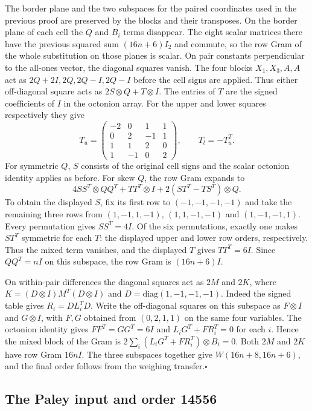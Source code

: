 \documentclass[10pt]{article}
\begin{document}
The border plane and the two subspaces for the paired coordinates used in the previous proof are preserved by the blocks and their transposes. On the border plane of each cell the $Q$ and $B_i$ terms disappear. The eight scalar matrices there have the previous squared sum $(16n+6)I_2$ and commute, so the row Gram of the whole substitution on those planes is scalar.
On pair constants perpendicular to the all-ones vector, the diagonal squares vanish. The four blocks $X_1,X_3,A,A$ act as $2Q+2I,2Q,2Q-I,2Q-I$ before the cell signs are applied. Thus either off-diagonal square acts as $2S\otimes Q+T\otimes I$. The entries of $T$ are the signed coefficients of $I$ in the octonion array. For the upper and lower squares respectively they give
\[
 T_u=\begin{pmatrix}-2&0&1&1\\0&2&-1&1\\1&1&2&0\\1&-1&0&2\end{pmatrix},\qquad
 T_l=-T_u^T .
\]
For symmetric $Q$, $S$ consists of the original cell signs and the scalar octonion identity applies as before. For skew $Q$, the row Gram expands to
\[
 4SS^T\otimes QQ^T+TT^T\otimes I+2(ST^T-TS^T)\otimes Q .
\]
To obtain the displayed $S$, fix its first row to $(-1,-1,-1,-1)$ and take the remaining three rows from $(1,-1,1,-1)$, $(1,1,-1,-1)$ and $(1,-1,-1,1)$. Every permutation gives $SS^T=4I$. Of the six permutations, exactly one makes $ST^T$ symmetric for each $T$: the displayed upper and lower row orders, respectively. Thus the mixed term vanishes, and the displayed $T$ gives $TT^T=6I$. Since $QQ^T=nI$ on this subspace, the row Gram is $(16n+6)I$.

On within-pair differences the diagonal squares act as $2M$ and $2K$, where $K=(D\otimes I)M^T(D\otimes I)$ and $D=\mathrm{diag}(1,-1,-1,-1)$. Indeed the signed table gives $R_i=DL_i^TD$. Write the off-diagonal squares on this subspace as $F\otimes I$ and $G\otimes I$, with $F,G$ obtained from $(0,2,1,1)$ on the same four variables. The octonion identity gives $FF^T=GG^T=6I$ and $L_iG^T+FR_i^T=0$ for each $i$. Hence the mixed block of the Gram is $2\sum_i(L_iG^T+FR_i^T)\otimes B_i=0$. Both $2M$ and $2K$ have row Gram $16nI$. The three subspaces together give $W(16n+8,16n+6)$, and the final order follows from the weighing transfer.\hfill$\square$

\subsection{The Paley input and order 14556}
\end{document}

